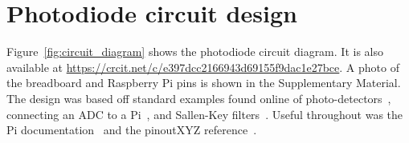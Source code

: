 \documentclass[paper-main.tex]{subfiles}
\begin{document}


\section{Photodiode circuit design}
\label{app:circuit_diagram}

Figure~\ref{fig:circuit_diagram} shows the photodiode circuit diagram. 
It is also available at \url{https://crcit.net/c/e397dcc2166943d69155f9dac1e27bce}. 
A photo of the breadboard and Raspberry Pi pins is shown in the Supplementary Material.
The design was based off standard examples found online of photo-detectors~\cite{photodiodecircuits1:online,photodiodecircuits2:online}, connecting an ADC to a Pi~\cite{piadcguide:online}, and Sallen-Key filters~\cite{sallenkey1:online,sallenkey2:online}. Useful throughout was the Pi documentation~\cite{pidocumentation:online} and the pinoutXYZ reference~\cite{pipinout:online}.
\end{document}
